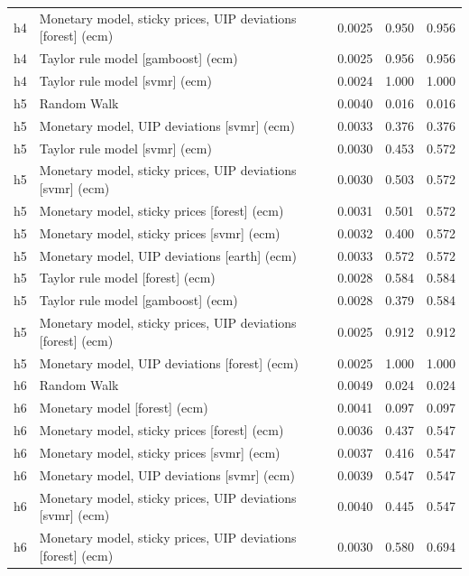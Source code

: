 \begin{ThreePartTable}
\begin{longtable}[t]{cp{5.5cm}ccc}
h4 & \raggedright Monetary model, sticky prices, UIP deviations [forest] (ecm) & 0.0025 & 0.950 & 0.956\\
h4 & \raggedright Taylor rule model [gamboost] (ecm) & 0.0025 & 0.956 & 0.956\\
h4 & \raggedright Taylor rule model [svmr] (ecm) & 0.0024 & 1.000 & 1.000\\
\addlinespace
h5 & \raggedright Random Walk & 0.0040 & 0.016 & 0.016\\
h5 & \raggedright Monetary model, UIP deviations [svmr] (ecm) & 0.0033 & 0.376 & 0.376\\
h5 & \raggedright Taylor rule model [svmr] (ecm) & 0.0030 & 0.453 & 0.572\\
h5 & \raggedright Monetary model, sticky prices, UIP deviations [svmr] (ecm) & 0.0030 & 0.503 & 0.572\\
h5 & \raggedright Monetary model, sticky prices [forest] (ecm) & 0.0031 & 0.501 & 0.572\\
h5 & \raggedright Monetary model, sticky prices [svmr] (ecm) & 0.0032 & 0.400 & 0.572\\
h5 & \raggedright Monetary model, UIP deviations [earth] (ecm) & 0.0033 & 0.572 & 0.572\\
h5 & \raggedright Taylor rule model [forest] (ecm) & 0.0028 & 0.584 & 0.584\\
h5 & \raggedright Taylor rule model [gamboost] (ecm) & 0.0028 & 0.379 & 0.584\\
h5 & \raggedright Monetary model, sticky prices, UIP deviations [forest] (ecm) & 0.0025 & 0.912 & 0.912\\
h5 & \raggedright Monetary model, UIP deviations [forest] (ecm) & 0.0025 & 1.000 & 1.000\\
\addlinespace
h6 & \raggedright Random Walk & 0.0049 & 0.024 & 0.024\\
h6 & \raggedright Monetary model [forest] (ecm) & 0.0041 & 0.097 & 0.097\\
h6 & \raggedright Monetary model, sticky prices [forest] (ecm) & 0.0036 & 0.437 & 0.547\\
h6 & \raggedright Monetary model, sticky prices [svmr] (ecm) & 0.0037 & 0.416 & 0.547\\
h6 & \raggedright Monetary model, UIP deviations [svmr] (ecm) & 0.0039 & 0.547 & 0.547\\
h6 & \raggedright Monetary model, sticky prices, UIP deviations [svmr] (ecm) & 0.0040 & 0.445 & 0.547\\
h6 & \raggedright Monetary model, sticky prices, UIP deviations [forest] (ecm) & 0.0030 & 0.580 & 0.694\\

\end{longtable}
\end{ThreePartTable}
